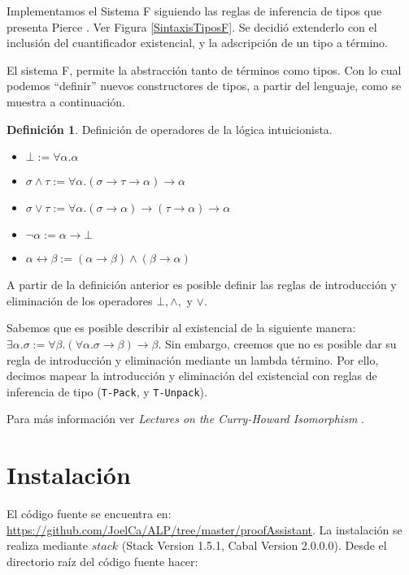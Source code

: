 \documentclass[a4paper,11pt]{article}
\theoremstyle{definition}
\newtheorem{definition}{Definición}
\theoremstyle{remark}
\begin{document}
Implementamos el Sistema F siguiendo las reglas de inferencia de tipos que presenta Pierce \cite{pierce}.
Ver Figura \ref{SintaxisTiposF}.
Se decidió extenderlo con el inclusión del cuantificador existencial, y la adscripción de un tipo a término.

El sistema F, permite la abstracción tanto de términos como tipos. Con lo cual podemos ``definir'' nuevos
constructores de tipos, a partir del lenguaje, como se muestra a continuación.

\begin{definition}
  Definición de operadores de la lógica intuicionista.

  \begin{itemize}
  \item $\bot := \forall \alpha. \alpha$
  \item $\sigma \wedge \tau := \forall \alpha. (\sigma \rightarrow \tau \rightarrow \alpha) \rightarrow \alpha$
  \item $\sigma \vee \tau := \forall \alpha. (\sigma \rightarrow \alpha) \rightarrow (\tau \rightarrow \alpha) \rightarrow \alpha$
  \item $\neg \alpha := \alpha \rightarrow \bot$
  \item $\alpha \leftrightarrow \beta := (\alpha \rightarrow \beta) \wedge (\beta \rightarrow \alpha)$ 
  \end{itemize}
\end{definition}

A partir de la definición anterior es posible definir las reglas de introducción y eliminación
de los operadores $\bot, \wedge,$ y $\vee$.

Sabemos que es posible describir al existencial de la siguiente manera:
$\exists \alpha. \sigma := \forall \beta. (\forall \alpha. \sigma \rightarrow \beta) \rightarrow \beta$.
Sin embargo, creemos que no es posible dar su regla de introducción y eliminación mediante un lambda término.
Por ello, decimos mapear la introducción y eliminación del existencial con reglas de inferencia de tipo (\texttt{T-Pack}, y \texttt{T-Unpack}).

Para más información ver \textit{Lectures on the Curry-Howard Isomorphism} \cite{curry-howard}.

\section{Instalación}

El código fuente se encuentra en: \url{https://github.com/JoelCa/ALP/tree/master/proofAssistant}.
La instalación se realiza mediante $stack$ (Stack Version 1.5.1, Cabal Version 2.0.0.0). 
Desde el directorio raíz del código fuente hacer:
\end{document}
